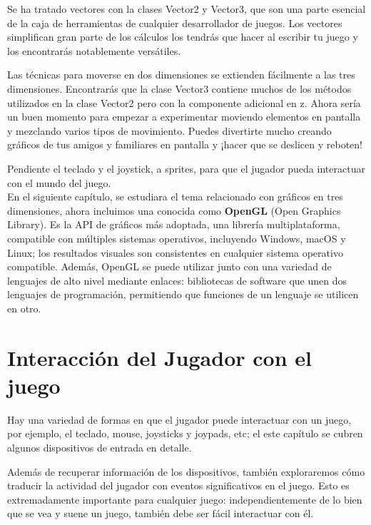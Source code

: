 {Se ha tratado vectores con la clases {\ttfamily Vector2} y  {\ttfamily Vector3}, que son una parte esencial de la caja de herramientas de cualquier desarrollador de juegos. Los vectores simplifican gran parte de los cálculos los tendrás que hacer al escribir tu juego y los encontrarás notablemente versátiles. 


Las técnicas para moverse en dos dimensiones se extienden fácilmente a las tres dimensiones. Encontrarás que la
clase  {\ttfamily Vector3} contiene muchos de los métodos utilizados en la clase {\ttfamily Vector2} pero con la componente adicional en {\ttfamily z}. Ahora sería un buen momento para empezar a experimentar moviendo elementos en pantalla y mezclando varios
tipos de movimiento. Puedes divertirte mucho creando gráficos de tus amigos y familiares en pantalla y
¡hacer que se deslicen y reboten! 



Pendiente  el teclado y el joystick, a sprites, para que el jugador pueda interactuar con el mundo del juego.\\


En el siguiente capítulo, se estudiara el tema relacionado con gráficos en tres dimensiones, ahora incluimos una conocida como  {\bf{ OpenGL}} (Open Graphics Library). Es la  API de gráficos más adoptada, una librería  multiplataforma, compatible con múltiples sistemas operativos, incluyendo Windows, macOS y Linux; los resultados visuales son consistentes en cualquier sistema operativo compatible. Además, OpenGL se puede utilizar junto con una variedad de lenguajes de alto nivel mediante enlaces: bibliotecas de software que unen dos lenguajes de programación, permitiendo que funciones de un lenguaje se utilicen en otro. 




\chapter{Interacción del Jugador con el juego}   %

Hay una variedad de formas en que el jugador puede interactuar con un juego, por ejemplo, el teclado, mouse, joysticks y joypads, etc;   el este capítulo se cubren algunos dispositivos de entrada en detalle.


Además de recuperar información de los dispositivos, también exploraremos cómo traducir la actividad del jugador con
eventos significativos en el juego. Esto es extremadamente importante para cualquier juego: independientemente de lo 
bien que se vea y suene un juego, también debe ser fácil interactuar con él.



}
